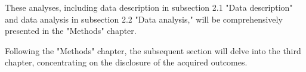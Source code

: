 These analyses, including data description in subsection 2.1 "Data description" and data analysis in subsection 2.2 "Data analysis," will be comprehensively presented in the "Methods" chapter. 

Following the "Methods" chapter, the subsequent section will delve into the third chapter, concentrating on the disclosure of the acquired outcomes.

